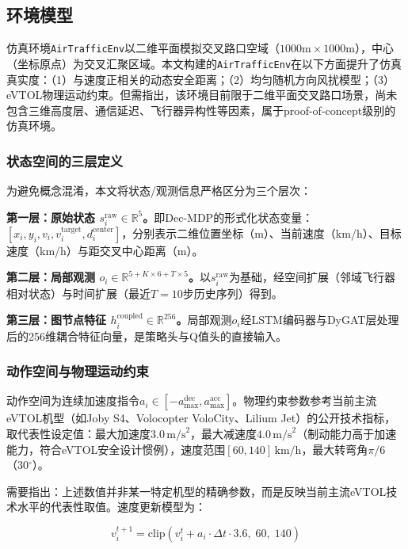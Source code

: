 \documentclass[12pt,a4paper,UTF8]{ctexart}
\begin{document}
\subsection{环境模型}

仿真环境\texttt{AirTrafficEnv}以二维平面模拟交叉路口空域（$1000\text{m} \times 1000\text{m}$），中心（坐标原点）为交叉汇聚区域。本文构建的\texttt{AirTrafficEnv}在以下方面提升了仿真真实度：（1）与速度正相关的动态安全距离；（2）均匀随机方向风扰模型；（3）eVTOL物理运动约束。但需指出，该环境目前限于二维平面交叉路口场景，尚未包含三维高度层、通信延迟、飞行器异构性等因素，属于proof-of-concept级别的仿真环境。

\subsubsection{状态空间的三层定义}

为避免概念混淆，本文将状态/观测信息严格区分为三个层次：

\textbf{第一层：原始状态 $s_i^{\text{raw}} \in \mathbb{R}^5$。}即Dec-MDP的形式化状态变量：$[x_i, y_i, v_i, v_i^{\text{target}}, d_i^{\text{center}}]$，分别表示二维位置坐标（m）、当前速度（km/h）、目标速度（km/h）与距交叉中心距离（m）。

\textbf{第二层：局部观测 $o_i \in \mathbb{R}^{5 + K \times 6 + T \times 5}$。}以$s_i^{\text{raw}}$为基础，经空间扩展（邻域飞行器相对状态）与时间扩展（最近$T=10$步历史序列）得到。

\textbf{第三层：图节点特征 $h_i^{\text{coupled}} \in \mathbb{R}^{256}$。}局部观测$o_i$经LSTM编码器与DyGAT层处理后的256维耦合特征向量，是策略头与Q值头的直接输入。

\subsubsection{动作空间与物理运动约束}

动作空间为连续加速度指令$a_i \in [-a_{\max}^{\text{dec}}, a_{\max}^{\text{acc}}]$。物理约束参数参考当前主流eVTOL机型（如Joby S4\cite{ref28}、Volocopter VoloCity\cite{ref29}、Lilium Jet\cite{ref30}）的公开技术指标，取代表性设定值：最大加速度$3.0\,\text{m/s}^2$，最大减速度$4.0\,\text{m/s}^2$（制动能力高于加速能力，符合eVTOL安全设计惯例），速度范围$[60, 140]\,\text{km/h}$，最大转弯角$\pi/6$（30$^\circ$）。

需要指出：上述数值并非某一特定机型的精确参数，而是反映当前主流eVTOL技术水平的代表性取值。速度更新模型为：

\begin{equation}
    v_i^{t+1} = \text{clip}\left(v_i^{t} + a_i \cdot \Delta t \cdot 3.6,\; 60,\; 140\right)
\end{equation}
\end{document}
